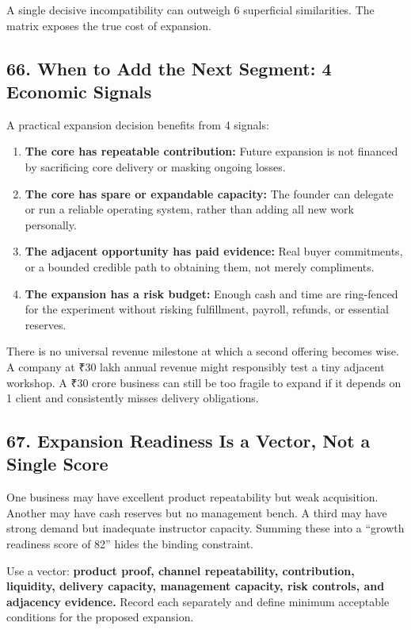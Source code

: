 A single decisive incompatibility can outweigh 6 superficial similarities. The matrix exposes the true cost of expansion.

\subsection*{66. When to Add the Next Segment: 4 Economic Signals}

A practical expansion decision benefits from 4 signals:

\begin{enumerate}
    \item \textbf{The core has repeatable contribution:} Future expansion is not financed by sacrificing core delivery or masking ongoing losses.
    \item \textbf{The core has spare or expandable capacity:} The founder can delegate or run a reliable operating system, rather than adding all new work personally.
    \item \textbf{The adjacent opportunity has paid evidence:} Real buyer commitments, or a bounded credible path to obtaining them, not merely compliments.
    \item \textbf{The expansion has a risk budget:} Enough cash and time are ring-fenced for the experiment without risking fulfillment, payroll, refunds, or essential reserves.
\end{enumerate}

There is no universal revenue milestone at which a second offering becomes wise. A company at ₹30 lakh annual revenue might responsibly test a tiny adjacent workshop. A ₹30 crore business can still be too fragile to expand if it depends on 1 client and consistently misses delivery obligations.

\subsection*{67. Expansion Readiness Is a Vector, Not a Single Score}

One business may have excellent product repeatability but weak acquisition. Another may have cash reserves but no management bench. A third may have strong demand but inadequate instructor capacity. Summing these into a ``growth readiness score of 82'' hides the binding constraint.

Use a vector: \textbf{product proof, channel repeatability, contribution, liquidity, delivery capacity, management capacity, risk controls, and adjacency evidence.} Record each separately and define minimum acceptable conditions for the proposed expansion.

